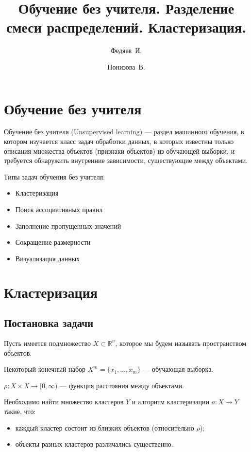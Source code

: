 \documentclass[12pt,pdf,notheorems]{beamer}
\title{Обучение без учителя. Разделение смеси распределений. Кластеризация.}
\author{Федяев~И. \and Понизова~В.}
\date[2019] %
\newcommand{\R}{\mathbb{R}}
\begin{document}
\frame{\titlepage}

\section[Обучение без учителя]{Обучение без учителя}

\begin{frame}
	Обучение без учителя (Unsupervised learning) --- раздел машинного обучения, в котором изучается класс задач обработки данных, в которых известны
	только описания множества объектов (признаки объектов) из обучающей выборки, и требуется обнаружить внутренние зависимости, существующие
	между объектами.
\end{frame}

\begin{frame}
	Типы задач обучения без учителя:
	\begin{itemize}
		\item Кластеризация
		\item Поиск ассоциативных правил
		\item Заполнение пропущенных значений
		\item Сокращение размерности
		\item Визуализация данных
	\end{itemize}
\end{frame}

\section[Кластеризация]{Кластеризация}
\subsection[Постановка задачи]{Постановка задачи}

\begin{frame}
Пусть имеется подмножество $X \subset \R^n$, которое мы будем называть пространством объектов.

	Некоторый конечный набор $X^m = \{x_1, \dots, x_m\}$ --- обучающая выборка.

	$\rho: X \times X \rightarrow [0, \infty)$ --- функция расстояния между объектами.

Необходимо найти множество кластеров $Y$ и алгоритм кластеризации $a: X \rightarrow Y$ такие, что:
	\begin{itemize}
		\item каждый кластер состоит из близких объектов (относительно $\rho$);
		\item объекты разных кластеров различались существенно.
	\end{itemize}
\end{frame}
\end{document}
